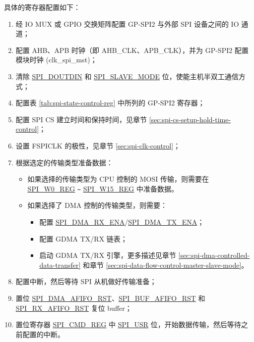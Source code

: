 \documentclass[main\_\_CN.tex]{subfiles}
\begin{document}
具体的寄存器配置如下：
\begin{enumerate}
    \item 经 IO MUX 或 GPIO 交换矩阵配置 GP-SPI2 与外部 SPI 设备之间的 IO 通道；
    \item 配置 AHB、APB 时钟（即 AHB\_CLK、APB\_CLK），并为 GP-SPI2 配置模块时钟 (clk\_spi\_mst)；

    \item 清除 \hyperref[fielddesc:SPIDOUTDIN]{SPI\_DOUTDIN} 和 \hyperref[fielddesc:SPISLAVEMODE]{SPI\_SLAVE\_MODE} 位，使能主机半双工通信方式；

    \item 配置表 \ref{tab:spi-state-control-reg} 中所列的 GP-SPI2 寄存器；

    \item 配置 SPI CS 建立时间和保持时间，见章节  \ref{sec:spi-cs-setup-hold-time-control}；

    \item 设置 FSPICLK 的极性，见章节  \ref{sec:spi-clk-control}；

    \item 根据选定的传输类型准备数据：
    \begin{itemize}
        \item 如果选择的传输类型为 CPU 控制的 MOSI 传输，则需要在 \hyperref[regdesc:SPIW0REG]{SPI\_W0\_REG} \verb+~+ \hyperref[regdesc:SPIW0REG]{SPI\_W15\_REG} 中准备数据。

        \item 如果选择了 DMA 控制的传输类型，则需要：
        \begin{itemize}
            \item 配置 \hyperref[fielddesc:SPIDMARXENA]{SPI\_DMA\_RX\_ENA}/\hyperref[fielddesc:SPIDMATXENA]{SPI\_DMA\_TX\_ENA}；
            \item 配置 GDMA TX/RX 链表；
            \item 启动 GDMA TX/RX 引擎，更多描述见章节  \ref{sec:spi-dma-controlled-data-transfer} 和章节  \ref{sec:spi-data-flow-control-master-slave-mode}。
        \end{itemize}
    \end{itemize}

    \item 配置中断，然后等待 SPI 从机做好传输准备；

    \item 置位 \hyperref[fielddesc:SPIDMAAFIFORST]{SPI\_DMA\_AFIFO\_RST}、\hyperref[fielddesc:SPIBUFAFIFORST]{SPI\_BUF\_AFIFO\_RST} 和 \hyperref[fielddesc:SPIRXAFIFORST]{SPI\_RX\_AFIFO\_RST} 复位 buffer；

    \item 置位寄存器 \hyperref[regdesc:SPICMDREG]{SPI\_CMD\_REG} 中 \hyperref[fielddesc:SPIUSR]{SPI\_USR} 位，开始数据传输，然后等待之前配置的中断。
\end{enumerate}
\end{document}
